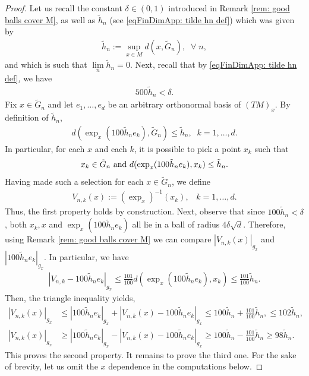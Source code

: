 \documentclass[11pt,reqno]{amsart}
\numberwithin{equation}{section}
\theoremstyle{plain}
\begin{document}
\begin{proof}
  Let us recall the constant $\delta\in(0,1)$ introduced in Remark \ref{rem: good balls cover M}, as well as $\tilde h_n$ (see  \eqref{eqFinDimApp: tilde hn def}) which was given by
  \begin{align*}
    \tilde h_n := \sup \limits_{x\in M} d(x,\tilde G_n),\;\;\forall\;n,
  \end{align*}
  and which is such that $\lim\limits_n \tilde h_n = 0$. Next, recall that by \eqref{eqFinDimApp: tilde hn def}, we have
  \begin{align*}
    500 \tilde h_n < \delta.
  \end{align*}
  Fix $x \in \tilde G_n$ and let $e_1,\ldots,e_d$ be an arbitrary orthonormal basis of $(TM)_x$. By definition of $\tilde h_n$, 
  \begin{align*}
    d(\exp_{x}(100\tilde h_ne_k),\tilde G_n)\leq \tilde h_n,\;\;k=1,\ldots,d.
  \end{align*}
  In particular, for each $x$ and each $k$, it is possible to pick a point $x_k$ such that
  \begin{align*}
    x_k \in \tilde G_n \textnormal{ and } d(\exp_{x}(100\tilde h_ne_k),x_k)\leq \tilde h_n.    	  
  \end{align*}
  Having made such a selection for each $x \in \tilde G_n$, we define
  \begin{align*}
    V_{n,k}(x) := (\exp_{x})^{-1}(x_k),\;\;\;k=1,\ldots,d.	  
  \end{align*}	  	  
  Thus, the first property holds by construction. Next, observe that since $100 \tilde h_n<\delta$, both $x_k,x$ and $\exp_{x}(100 \tilde h_n e_k)$ all lie in a ball of radius $4\delta\sqrt{d}$. Therefore, using Remark \ref{rem: good balls cover M} we can compare $|V_{n,k}(x)|_{g_x}$ and $|100\tilde h_n e_k|_{g_x}$.   
  In particular, we have
  \begin{align}\label{eqAppendix: difference between Vnk and 100ek}
    |V_{n,k}-100 \tilde h_n e_k|_{g_x} \leq \tfrac{101}{100} d(\exp_{x}(100\tilde h_ne_k),x_k) \leq \tfrac{101}{100} \tilde h_n.  
  \end{align}	
  Then, the triangle inequality yields,
  \begin{align*}
    |V_{n,k}(x)|_{g_x} & \leq |100\tilde h_n e_k|_{g_x} + |V_{n,k}(x)-100\tilde h_n e_k|_{g_x} \leq 100 \tilde h_n + \tfrac{101}{100} \tilde h_n, \leq 102 \tilde h_n,\\	  
    |V_{n,k}(x)|_{g_x} & \geq |100\tilde h_n e_k|_{g_x} -|V_{n,k}(x)-100\tilde h_n e_k|_{g_x} \geq 100 \tilde h_n - \tfrac{101}{100} \tilde h_n \geq 98 \tilde h_n.
  \end{align*}
  This proves the second property. It remains to prove the third one. For the sake of brevity, let us omit the $x$ dependence in the computations below. 
  

\end{proof}
\end{document}
